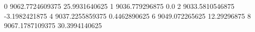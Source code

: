 0 9062.7724609375 25.9931640625
1 9036.779296875 0.0
2 9033.5810546875 -3.1982421875
4 9037.2255859375 0.4462890625
6 9049.072265625 12.29296875
8 9067.1787109375 30.3994140625
